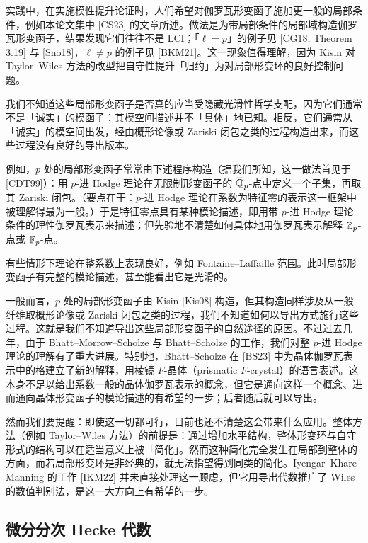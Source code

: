 实践中，在实施模性提升论证时，人们希望对伽罗瓦形变函子施加更一般的局部条件，例如本论文集中 [CS23] 的文章所述。做法是为带局部条件的局部域构造伽罗瓦形变函子，结果发现它们往往不是 LCI；「$\ell=p$」的例子见 [CG18, Theorem 3.19] 与 [Sno18]，$\ell\neq p$ 的例子见 [BKM21]。这一现象值得理解，因为 Kisin 对 Taylor–Wiles 方法的改型把自守性提升「归约」为对局部形变环的良好控制问题。

我们不知道这些局部形变函子是否真的应当受隐藏光滑性哲学支配，因为它们通常不是「诚实」的模函子：其模空间描述并不「具体」地已知。相反，它们通常从「诚实」的模空间出发，经由概形论像或 Zariski 闭包之类的过程构造出来，而这些过程没有良好的导出版本。

例如，$p$ 处的局部形变函子常常由下述程序构造（据我们所知，这一做法首见于 [CDT99]）：用 $p$-进 Hodge 理论在无限制形变函子的 $\overline{\mathbb{Q}}_p$-点中定义一个子集，再取其 Zariski 闭包。（要点在于：$p$-进 Hodge 理论在系数为特征零的表示这一框架中被理解得最为一般。）于是特征零点具有某种模论描述，即用带 $p$-进 Hodge 理论条件的理性伽罗瓦表示来描述；但先验地不清楚如何具体地用伽罗瓦表示解释 $\mathbb{Z}_p$-点或 $\mathbb{F}_p$-点。

有些情形下理论在整系数上表现良好，例如 Fontaine–Laffaille 范围。此时局部形变函子有完整的模论描述，甚至能看出它是光滑的。

一般而言，$p$ 处的局部形变函子由 Kisin [Kis08] 构造，但其构造同样涉及从一般纤维取概形论像或 Zariski 闭包之类的过程，我们不知道如何以导出方式施行这些过程。这就是我们不知道导出这些局部形变函子的自然途径的原因。不过过去几年，由于 Bhatt–Morrow–Scholze 与 Bhatt–Scholze 的工作，我们对整 $p$-进 Hodge 理论的理解有了重大进展。特别地，Bhatt–Scholze 在 [BS23] 中为晶体伽罗瓦表示中的格建立了新的解释，用棱镜 $F$-晶体（prismatic $F$-crystal）的语言表述。这本身不足以给出系数一般的晶体伽罗瓦表示的概念，但它是通向这样一个概念、进而通向晶体形变函子的模论描述的有希望的一步；后者随后就可以导出。

然而我们要提醒：即使这一切都可行，目前也还不清楚这会带来什么应用。整体方法（例如 Taylor–Wiles 方法）的前提是：通过增加水平结构，整体形变环与自守形式的结构可以在适当意义上被「简化」。然而这种简化完全发生在局部到整体的方面，而若局部形变环是非经典的，就无法指望得到同类的简化。Iyengar–Khare–Manning 的工作 [IKM22] 并未直接处理这一顾虑，但它用导出代数推广了 Wiles 的数值判别法，是这一大方向上有希望的一步。

\subsection{微分分次 Hecke 代数}


